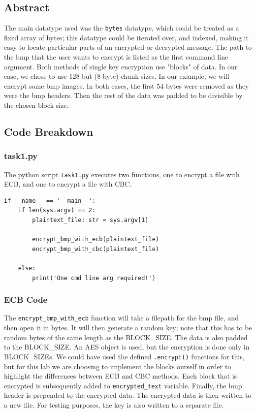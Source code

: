\documentclass[11pt]{article}
\begin{document}
\subsection*{Abstract}
The main datatype used was the \verb|bytes| datatype, which could be treated as a fixed array of bytes; this datatype could be iterated over, and indexed, making it easy to locate particular parts of an encrypted or decrypted message. The path to the bmp that the user wants to encrypt is listed as the first command line argument. Both methods of single key encryption use "blocks" of data. In our case, we chose to use 128 but (8 byte) chunk sizes. In our example, we will encrypt some bmp images. In both cases, the first 54 bytes were removed as they were the bmp headers. Then the rest of the data was padded to be divisible by the chosen block size.

\subsection*{Code Breakdown}
\subsubsection*{task1.py}

The python script \verb|task1.py| executes two functions, one to encrypt a file with ECB, and one to encrypt a file with CBC. 

\begin{framed}
\begin{verbatim}
if __name__ == '__main__':
    if len(sys.argv) == 2:
        plaintext_file: str = sys.argv[1]

        encrypt_bmp_with_ecb(plaintext_file)
        encrypt_bmp_with_cbc(plaintext_file)

    else:
        print('One cmd line arg required!')
\end{verbatim}
\end{framed}

\subsubsection*{ECB Code}

The \verb|encrypt_bmp_with_ecb| function will take a filepath for the bmp file, and then open it in bytes. It will then generate a random key; note that this has to be random bytes of the same length as the BLOCK\_SIZE. The data is also padded to the BLOCK\_SIZE. An AES object is used, but the encryption is done only in BLOCK\_SIZEs. We could have used the defined \verb|.encrypt()| functions for this, but for this lab we are choosing to implement the blocks ourself in order to highlight the differences between ECB and CBC methods. Each block that is encrypted is subsequently added to \verb|encrypted_text| variable. Finally, the bmp header is prepended to the encrypted data. The encrypted data is then written to a new file. For testing purposes, the key is also written to a separate file. 
\end{document}
